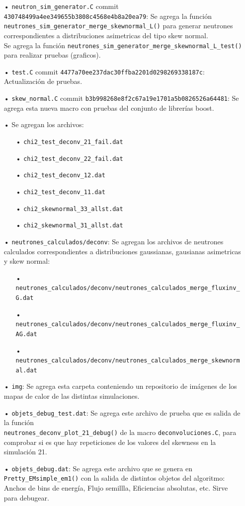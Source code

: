 \documentclass[11pt,letterpaper]{article}
\begin{document}
\begin{itemize}
\item[•] \verb|neutron_sim_generator.C| commit \verb|430748499a4ee349655b3808c4568e4b8a20ea79|: Se agrega la función \verb|neutrones_sim_generator_merge_skewnormal_L()| para generar neutrones correspondientes a distribuciones asimetricas del tipo skew normal.\\
 Se agrega la función \verb|neutrones_sim_generator_merge_skewnormal_L_test()| para realizar pruebas (graficos).
\item[•]\verb|test.C| commit \verb|4477a70ee237dac30ffba2201d0298269338187c|: Actualización de pruebas.
\item[•] \verb|skew_normal.C| commit \verb|b3b998268e8f2c67a19e1701a5b0826526a64481|: Se agrega esta nueva macro con pruebas del conjunto de librerías boost.
\item[•] Se agregan los archivos:
\begin{itemize}
\item[•]\verb|chi2_test_deconv_21_fail.dat|
\item[•] \verb|chi2_test_deconv_22_fail.dat|
\item[•]\verb|chi2_test_deconv_12.dat|
\item[•]\verb|chi2_test_deconv_11.dat|
\item[•]\verb|chi2_skewnormal_33_allst.dat|
\item[•]\verb|chi2_skewnormal_31_allst.dat|
\end{itemize}
\item[•] \verb|neutrones_calculados/deconv|: Se agregan los archivos de neutrones calculados correspondientes a distribuciones gaussianas, gausianas asimetricas y skew normal:
\begin{itemize}
\item[•]\verb|neutrones_calculados/deconv/neutrones_calculados_merge_fluxinv_G.dat|
\item[•]\verb|neutrones_calculados/deconv/neutrones_calculados_merge_fluxinv_AG.dat|
\item[•]\verb|neutrones_calculados/deconv/neutrones_calculados_merge_skewnormal.dat|
\end{itemize}
\item[•] \verb|img|: Se agrega esta carpeta conteniendo un repositorio de imágenes de los mapas de calor de las distintas simulaciones.
\item[•] \verb|objets_debug_test.dat|: Se agrega este archivo de prueba que es salida de la función\\
 \verb|neutrones_deconv_plot_21_debug()| de la macro \verb|deconvoluciones.C|, para comprobar si es que hay repeticiones de los valores del skewness en la simulación 21.
\item[•]\verb|objets_debug.dat|: Se agrega este archivo que se genera en \verb|Pretty_EMsimple_em1()| con la salida de distintos objetos del algoritmo: Anchos de bins de energía, Flujo semillla, Eficiencias absolutas, etc. Sirve para debugear.
\end{itemize}
\end{document}
